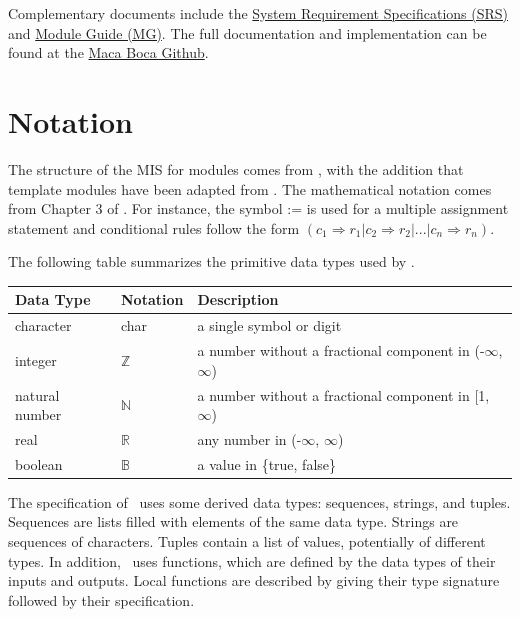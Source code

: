 \documentclass[12pt, titlepage]{article}
\begin{document}
Complementary documents include the
\href{https://github.com/Nour-Fawaz/MacaBoca/blob/main/pdfs/SRS/SRS.pdf}{System Requirement Specifications (SRS)}
and \href{https://github.com/Nour-Fawaz/MacaBoca/blob/main/pdfs/Design/SoftArchitecture/MG.pdf}{Module Guide (MG)}.  
The full documentation and implementation can be found at the
\href{https://github.com/Nour-Fawaz/MacaBoca}{Maca Boca Github}.

\section{Notation}

The structure of the MIS for modules comes from \citet{HoffmanAndStrooper1995},
with the addition that template modules have been adapted from
\cite{GhezziEtAl2003}.  The mathematical notation comes from Chapter 3 of
\citet{HoffmanAndStrooper1995}.  For instance, the symbol := is used for a
multiple assignment statement and conditional rules follow the form $(c_1
\Rightarrow r_1 | c_2 \Rightarrow r_2 | ... | c_n \Rightarrow r_n )$.

The following table summarizes the primitive data types used by \progname. 

\begin{center}
\renewcommand{\arraystretch}{1.2}
\noindent 
\begin{tabular}{l l p{7.5cm}} 
\toprule 
\textbf{Data Type} & \textbf{Notation} & \textbf{Description}\\ 
\midrule
character & char & a single symbol or digit\\
integer & $\mathbb{Z}$ & a number without a fractional component in (-$\infty$, $\infty$) \\
natural number & $\mathbb{N}$ & a number without a fractional component in [1, $\infty$) \\
real & $\mathbb{R}$ & any number in (-$\infty$, $\infty$)\\
boolean & $\mathbb{B}$ & a value in \{true, false\}\\
\bottomrule
\end{tabular} 
\end{center}

\noindent
The specification of \progname \ uses some derived data types: sequences, strings, and
tuples. Sequences are lists filled with elements of the same data type. Strings
are sequences of characters. Tuples contain a list of values, potentially of
different types. In addition, \progname \ uses functions, which
are defined by the data types of their inputs and outputs. Local functions are
described by giving their type signature followed by their specification.
\end{document}
